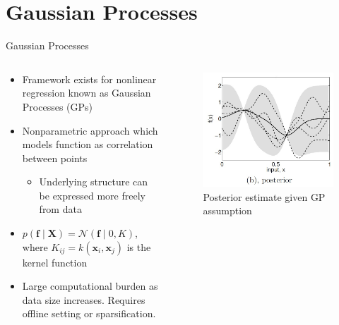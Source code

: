 \documentclass[11pt,mathserif]{beamer}
\newcommand{\vx} {\mathbf{x}}
\newcommand{\vX} {\mathbf{X}}
\newcommand{\vf} {\mathbf{f}}
\newcommand{\N} {\mathcal{N}}
\begin{document}
\section[Gaussian Processes]{Gaussian Processes}
\begin{frame}[t]{Gaussian Processes}
\begin{columns}[T]
	\begin{column}{.5\textwidth}
	\begin{itemize}	\itemsep 0.1in
		\item Framework exists for nonlinear regression known as Gaussian Processes (GPs)

		\item Nonparametric approach which models function as correlation between points
\begin{itemize}
\item Underlying structure can be expressed more freely from data

\end{itemize}
		\item  $p(\vf \mid \vX) = \N (\vf \mid 0, K)$, where
                  $K_{ij} = k(\vx_i, \vx_j)$ is the kernel function
\item Large computational burden as data size increases. Requires offline setting or sparsification.


	\end{itemize}
	\end{column}
	
	\begin{column}{.5\textwidth}
\begin{figure}
	\includegraphics[width=\columnwidth]{figures/GPpost}
\caption{Posterior estimate given GP assumption}
\end{figure}
	\end{column}		
\end{columns}

\end{frame}
\end{document}
